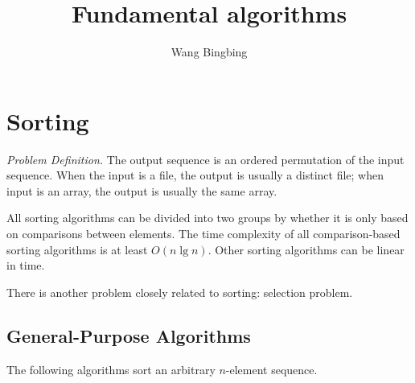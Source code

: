 \documentclass[12pt]{article}
\title{Fundamental algorithms}
\author{Wang Bingbing}
\begin{document}
\maketitle

\section{Sorting}

\emph{Problem Definition.}
    The output sequence is an ordered permutation of the input sequence.
    When the input is a file, the output is usually a distinct file; when
    input is an array, the output is usually the same array.

All sorting algorithms can be divided into two groups by whether it is only
based on comparisons between elements.  The time complexity of all
comparison-based sorting algorithms is at least $O(n\lg{n})$.  Other
sorting algorithms can be linear in time.

There is another problem closely related to sorting: selection problem.

\subsection{General-Purpose Algorithms}
The following algorithms sort an arbitrary $n$-element sequence.
\end{document}
